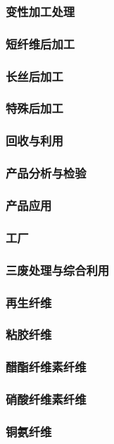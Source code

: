 \documentclass[UTF8]{../../ApplicationUniverse}
\begin{document}
            \subsubsection{变性加工处理}
            \subsubsection{短纤维后加工}
            \subsubsection{长丝后加工}
            \subsubsection{特殊后加工}
        \subsubsection{回收与利用}
    \subsubsection{产品分析与检验}
        \subsubsection{产品应用}
    \subsubsection{工厂}
    \subsubsection{三废处理与综合利用}
\subsubsection{再生纤维}
    \subsubsection{粘胶纤维}
    \subsubsection{醋酯纤维素纤维}
    \subsubsection{硝酸纤维素纤维}
    \subsubsection{铜氨纤维}
\end{document}
